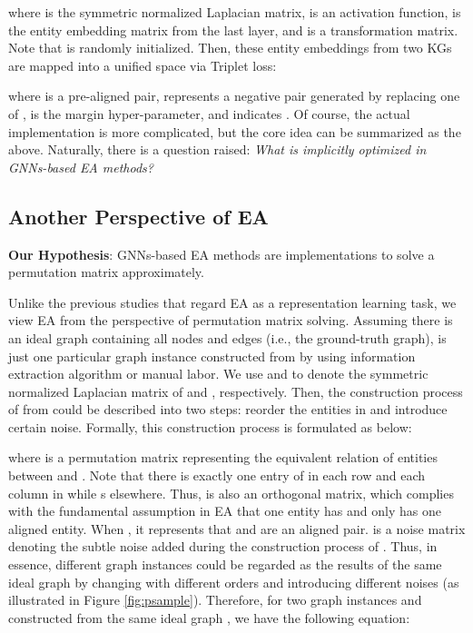 \documentclass[sigconf]{acmart}
\begin{document}
where  is the symmetric normalized Laplacian matrix,  is an activation function,  is the entity embedding matrix from the last layer, and  is a transformation matrix. 
Note that  is randomly initialized.
Then, these entity embeddings from two KGs are mapped into a unified space via Triplet loss:

where  is a pre-aligned pair,  represents a negative pair generated by replacing one of ,  is the margin hyper-parameter, and  indicates .
Of course, the actual implementation is more complicated, but the core idea can be summarized as the above.
Naturally, there is a question raised: \textit{What is implicitly optimized in GNNs-based EA methods?} 

\vspace{-1em}
\subsection{Another Perspective of EA}
\textbf{Our Hypothesis}: GNNs-based EA methods are implementations to solve a permutation matrix approximately.

Unlike the previous studies that regard EA as a representation learning task, we view EA from the perspective of permutation matrix solving.
Assuming there is an ideal graph  containing all nodes and edges (i.e., the ground-truth graph),  is just one particular graph instance constructed from  by using information extraction algorithm or manual labor.
We use  and  to denote the symmetric normalized Laplacian matrix of  and , respectively.
Then, the construction process of  from  could be described into two steps: reorder the entities in  and introduce certain noise.
Formally, this construction process is formulated as below:

where  is a permutation matrix representing the equivalent relation of entities between  and .
Note that there is exactly one entry of  in each row and each column in  while s elsewhere.
Thus,  is also an orthogonal matrix, which complies with the fundamental assumption in EA that one entity has and only has one aligned entity.
When , it represents that  and  are an aligned pair.
 is a noise matrix denoting the subtle noise added during the construction process of .
Thus, in essence, different graph instances could be regarded as the results of the same ideal graph by changing with different orders and introducing different noises (as illustrated in Figure \ref{fig:psample}).
Therefore, for two graph instances  and  constructed from the same ideal graph , we have the following equation:
\end{document}

